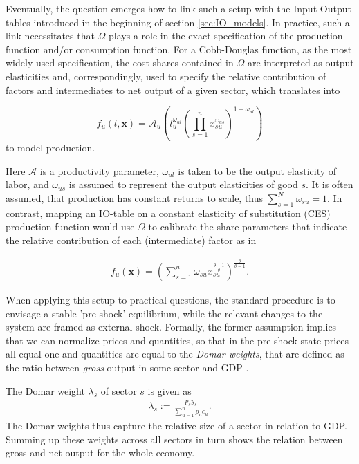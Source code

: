 Eventually, the question emerges how to link such a setup with the Input-Output tables introduced in the beginning of section \ref{sec:IO_models}. In practice, such a link necessitates that $\Omega$ plays a role in the exact specification of the production function and/or consumption function. For a Cobb-Douglas function, as the most widely used specification, the cost shares contained in $\Omega$ are interpreted as output elasticities and, correspondingly, used to specify the relative contribution of factors and intermediates to net output of a given sector, which translates into

\begin{equation}
  \label{eq:cobbdouglasprodfun}
  f_u(l,\mathbf x) = \mathcal A_u \left(l_u^{\omega_{ul}} \left(\prod_{s=1}^n x_{su}^{\omega_{us}}\right)^{1-\omega_{ul}}\right)
\end{equation}
to model production.

Here $\mathbf{\mathcal A}$ is a productivity parameter, $\omega_{ul}$ is taken to be the output elasticity of labor, and $\omega_{us}$ is assumed to represent the output elasticities of good $s$. It is often assumed, that production has constant returns to scale, thus $\sum_{s=1}^N \omega_{su} = 1$. In contrast, mapping an IO-table on a constant elasticity of substitution (CES) production function would use $\Omega$ to calibrate the share parameters that indicate the relative contribution of each (intermediate) factor as in 

\begin{align}
  f_u(\mathbf x) = \left( \sum_{s = 1}^n \omega_{su} x_{su}^{\frac{\theta - 1}{\theta}}\right)^{\frac{\theta}{\theta - 1}}.
\end{align}

When applying this setup  to practical questions, the standard procedure is to envisage a stable 'pre-shock' equilibrium, while the relevant changes to the system are framed as external shock. Formally, the former assumption implies that we can normalize prices and quantities, so that in the pre-shock state prices all equal one and quantities are equal to the \textit{Domar weights}, that are defined as the ratio between \textit{gross} output in some sector and GDP \citep[see][]{Hulten.1978}.

\begin{definition}
  The Domar weight $\lambda_s$ of sector $s$ is given as 
  \begin{align}
    \lambda_s := \frac{p_s y_s}{\sum_{u=1}^n p_u c_u}.
  \end{align}
The Domar weights thus capture the relative size of a sector in relation to GDP. Summing up these weights across all sectors in turn shows the relation between gross and net output for the whole economy.
\end{definition}

